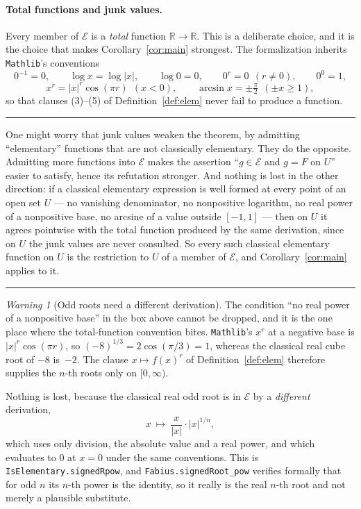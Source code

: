 \documentclass[11pt,oneside]{article}
\theoremstyle{definition}
\theoremstyle{remark}
\newtheorem{warning}[theorem]{Warning}
\newcommand{\R}{\mathbb R}
\newcommand{\Elem}{\mathcal E}
\newenvironment{boxedremark}{%
  \par\smallskip\noindent\begin{center}\begin{minipage}{0.94\textwidth}%
  \color{black}\hrule\vspace{0.6em}\small
}{%
  \vspace{0.6em}\hrule\end{minipage}\end{center}\smallskip
}
\begin{document}
\paragraph{Total functions and junk values.}
Every member of $\Elem$ is a \emph{total} function $\R\to\R$.  This is a
deliberate choice, and it is the choice that makes Corollary~\ref{cor:main} strongest.
The formalization inherits \texttt{Mathlib}'s conventions
\[
  0^{-1}=0,\qquad \log x=\log|x|,\qquad \log 0=0,\qquad
  0^{r}=0\ \ (r\ne 0),\qquad 0^{0}=1,
\]
\[
  x^{r}=|x|^{r}\cos(\pi r)\ \ (x<0),\qquad
  \arcsin x=\pm\tfrac{\pi}{2}\ \ (\pm x\ge 1),
\]
so that clauses (3)--(5) of Definition~\ref{def:elem} never fail to produce a function.

\begin{boxedremark}
One might worry that junk values weaken the theorem, by admitting
``elementary'' functions that are not classically elementary.  They do the
opposite.  Admitting more functions into $\Elem$ makes the assertion ``$g\in
\Elem$ and $g=F$ on $U$'' easier to satisfy, hence its refutation
stronger.  And nothing is lost in the other direction: if a classical
elementary expression is well formed at every point of an open set $U$ --- no
vanishing denominator, no nonpositive logarithm, no real power of a
nonpositive base, no arcsine of a value outside $[-1,1]$ --- then on $U$ it
agrees pointwise with the total function produced by the same derivation,
since on $U$ the junk values are never consulted.  So every such classical
elementary function on $U$ is the restriction to $U$ of a member of $\Elem$,
and Corollary~\ref{cor:main} applies to it.
\end{boxedremark}

\begin{warning}[Odd roots need a different derivation]\label{warn:oddroot}
The condition ``no real power of a nonpositive base'' in the box above cannot
be dropped, and it is the one place where the total-function convention bites.
\texttt{Mathlib}'s $x^{r}$ at a negative base is $|x|^{r}\cos(\pi r)$, so
$(-8)^{1/3}=2\cos(\pi/3)=1$, whereas the classical real cube root of $-8$
is~$-2$.  The clause $x\mapsto f(x)^{r}$ of Definition~\ref{def:elem} therefore supplies
the $n$-th roots only on $[0,\infty)$.

Nothing is lost, because the classical real odd root is in $\Elem$ by a
\emph{different} derivation,
\[
  x\ \longmapsto\ \frac{x}{|x|}\cdot|x|^{1/n},
\]
which uses only division, the absolute value and a real power, and which
evaluates to $0$ at $x=0$ under the same conventions.  This is
\texttt{IsElementary.signedRpow}, and
\texttt{Fabius.signedRoot\_pow} verifies formally that for odd $n$ its $n$-th
power is the identity, so it really is the real $n$-th root and not merely a
plausible substitute.
\end{warning}
\end{document}
